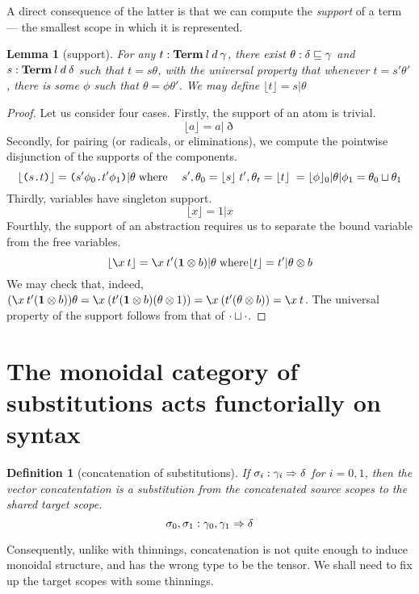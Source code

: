 \documentclass{jfp1}
\newtheorem{lemma}[theorem]{Lemma}
\newtheorem{definition}[theorem]{Definition}
\newcommand{\Pa}[1]{\texttt{(}#1\texttt{)}}
\newcommand{\dt}{\texttt{.}}
\newcommand{\cn}[2]{\Pa{#1 \dt #2}}
\begin{document}
A direct consequence of the latter is that we can compute the
\emph{support} of a term --- the smallest scope in which it is
represented.
\newcommand{\supp}[1]{\lfloor #1 \rfloor}
\begin{lemma}[support]
  For any $t:\mathbf{Term}\:l\:d\:\gamma$, there exist $\theta:\delta\sqsubseteq\gamma$ and
  $s:\mathbf{Term}\:l\:d\:\delta$ such that $t = s\theta$, with the universal
  property that whenever $t=s'\theta'$, there is some $\phi$ such that
  $\theta=\phi\theta'$. We may define $\supp t = s|\theta$
\end{lemma}
\begin{proof}
  Let us consider four cases. Firstly, the support of an atom is
  trivial.
  \[
    \supp a = a|\eth
  \]
  Secondly, for pairing (or radicals, or
  eliminations), we compute the pointwise disjunction of the supports of the components.
  \[
    \supp{\cn st} = \cn{s'\phi_0}{t'\phi_1}|\theta\;\mbox{where}\quad
    \;s',\theta_0=\supp s\; t',\theta_t=\supp t\;
    =\supp\phi_0|\theta|\phi_1 = \cp{\theta_0}{\theta_1} \\
  \]
  Thirdly, variables have singleton support.
  \[
    \supp x = 1|x
  \]
  Fourthly, the support of an abstraction requires us to separate the
  bound variable from the free variables.
  \[
    \supp{\la xt} = \la xt'(\ith\otimes b)|\theta\;\mbox{where}\supp
    t=t'|\theta\otimes b
  \]
  We may check that, indeed,
  $(\la xt'(\ith\otimes b))\theta
  = \la x(t'(\ith\otimes b)(\theta\otimes 1))
  = \la x(t'(\theta\otimes b)) = \la xt$.
  The universal property of the support follows from that of $\cdot \sqcup \cdot$.
\end{proof}


\section{The monoidal category of substitutions acts functorially on syntax\label{sec:sbstcat}}


\begin{definition}[concatenation of substitutions]
  If $\sigma_i:\gamma_i\Rightarrow\delta$ for $i=0,1$, then the vector
  concatentation is a substitution from the concatenated source scopes
  to the shared target scope.
  \[\sigma_0,\sigma_1 : \gamma_0,\gamma_1\Rightarrow\delta
    \]
\end{definition}

Consequently, unlike with thinnings, concatenation is not quite enough
to induce monoidal structure, and has the wrong type to be the tensor.
We shall need to fix up the target scopes with some thinnings.
\end{document}
